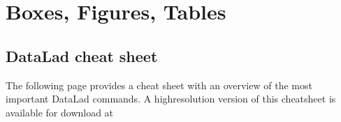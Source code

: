 \chapter{Boxes, Figures, Tables}

\listoffigures
\listoftables

\sphinxstepscope

\ignorespaces 
{}\ignorespaces 

\section{DataLad cheat sheet}
\label{\detokenize{basics/101-136-cheatsheet:datalad-cheat-sheet}}\label{\detokenize{basics/101-136-cheatsheet:cheat}}\label{\detokenize{basics/101-136-cheatsheet:id1}}\label{\detokenize{basics/101-136-cheatsheet:index-1}}\label{\detokenize{basics/101-136-cheatsheet:index-0}}\label{\detokenize{basics/101-136-cheatsheet::doc}}
\sphinxAtStartPar
The following page provides a cheat sheet with an overview of the most
important DataLad commands. A high\sphinxhyphen{}resolution version of this cheatsheet is
available for download at

\clearpage{\thispagestyle{empty}\cleardoublepage}
{\thispagestyle{empty}%

\noindent{}

} %
\newpage
\clearpage{\thispagestyle{empty}\cleardoublepage}

